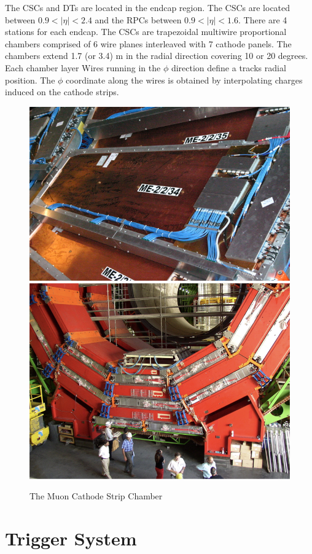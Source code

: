 {The CSCs and DTs are  located in the endcap region. The CSCs are located between $0.9 < |\eta| < 2.4$ and the RPCs between $0.9 < |\eta| < 1.6$. There are 4 stations for each endcap. The CSCs are trapezoidal multiwire proportional chambers comprised
 of 6 wire planes interleaved with 7 cathode panels. The chambers extend 1.7 (or 3.4) m 
in the radial direction covering 10 or 20 degrees. Each chamber layer 
Wires running in the $\phi$ direction define a tracks radial position. The $\phi$ 
coordinate along the wires is obtained by interpolating charges induced 
on the cathode strips. 


\begin{figure}
\begin{center}
\includegraphics[width=.45\textwidth]{pics/cathode_strip_chamber}
\includegraphics[width=.45\textwidth]{pics/rpc_plates}
\end{center}
\caption{The Muon Cathode Strip Chamber}
\label{fig:strip_chamber}
\end{figure}


\section{Trigger System}

}
